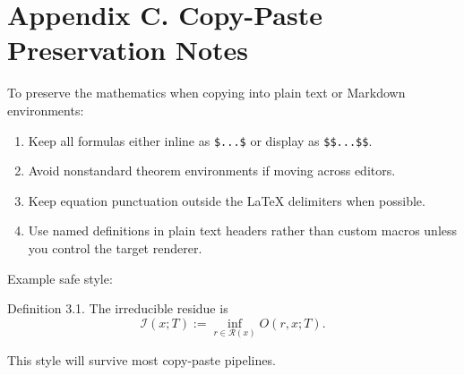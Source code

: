 \documentclass[
]{article}
\providecommand{\tightlist}{%
  \setlength{\itemsep}{0pt}\setlength{\parskip}{0pt}}
\begin{document}
\section{Appendix C. Copy-Paste Preservation
Notes}\label{appendix-c.-copy-paste-preservation-notes}

To preserve the mathematics when copying into plain text or Markdown
environments:

\begin{enumerate}
\def\labelenumi{\arabic{enumi}.}
\tightlist
\item
  Keep all formulas either inline as \texttt{\$...\$} or display as
  \texttt{\$\$...\$\$}.
\item
  Avoid nonstandard theorem environments if moving across editors.
\item
  Keep equation punctuation outside the LaTeX delimiters when possible.
\item
  Use named definitions in plain text headers rather than custom macros
  unless you control the target renderer.
\end{enumerate}

Example safe style:

Definition 3.1. The irreducible residue is \[
\mathcal{I}(x;T) := \inf_{r \in \mathcal{R}(x)} O(r,x;T).
\]

This style will survive most copy-paste pipelines.
\end{document}
